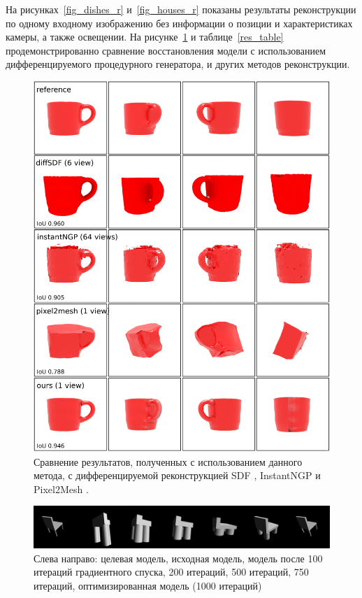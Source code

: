 \documentclass[a4paper,hidelinks,12pt]{article}
\begin{document}
\par
На рисунках~\ref{fig_dishes_r} и~\ref{fig_houses_r} показаны результаты реконструкции по одному входному изображению без информации о позиции и характеристиках камеры, а также освещении. На рисунке~\ref{fig_compare} и таблице~\ref{res_table} продемонстрированно сравнение восстановления модели с использованием дифференцируемого процедурного генератора, и других методов реконструкции.
\par
\begin{figure}[H]
\begin{center}
	\includegraphics[width=15 cm]{checks.png}
	\caption{Сравнение результатов, полученных с использованием данного метода, с дифференцируемой реконструкцией SDF \cite{vicini2022differentiable}, InstantNGP \cite{muller2022instant} и Pixel2Mesh \cite{wang2018pixel2mesh}.}
 	\label{fig_compare}
\end{center}
\end{figure}

\begin{figure}[H]
\begin{center}
	\includegraphics[width=15 cm]{chair_optimization.png}
	\caption{Слева направо: целевая модель, исходная модель, модель после 100 итераций градиентного спуска, 200 итераций, 500 итераций, 750 итераций, оптимизированная модель (1000 итераций)}
 	\label{fig_chair_opt}
\end{center}
\end{figure}
\end{document}
